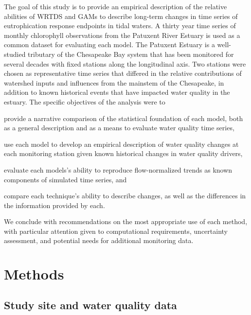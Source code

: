 \documentclass[letterpaper,12pt,oneside]{article}\usepackage[]{graphicx}\usepackage[]{color}
\begin{document}
The goal of this study is to provide an empirical description of the relative abilities of \ac{WRTDS} and \acp{GAM} to describe long-term changes in time series of eutrophication response endpoints in tidal waters.  A thirty year time series of monthly chlorophyll observations from the Patuxent River Estuary is used as a common dataset for evaluating each model.  The Patuxent Estuary is a well-studied tributary of the Chesapeake Bay system that has been monitored for several decades with fixed stations along the longitudinal axis.  Two stations were chosen as representative time series that differed in the relative contributions of watershed inputs and influences from the mainstem of the Chesapeake, in addition to known historical events that have impacted water quality in the estuary.  The specific objectives of the analysis were to \begin{inparaenum}[1\upshape)]
\item provide a narrative comparison of the statistical foundation of each model, both as a general description and as a means to evaluate water quality time series,
\item use each model to develop an empirical description of water quality changes at each monitoring station given known historical changes in water quality drivers,
\item evaluate each models's ability to reproduce flow-normalized trends as known components of simulated time series, and
\item compare each technique's ability to describe changes, as well as the differences in the information provided by each. 
\end{inparaenum}
We conclude with recommendations on the most appropriate use of each method, with particular attention given to computational requirements, uncertainty assessment, and potential needs for additional monitoring data.

\section{Methods}

\subsection{Study site and water quality data}

\end{document}
